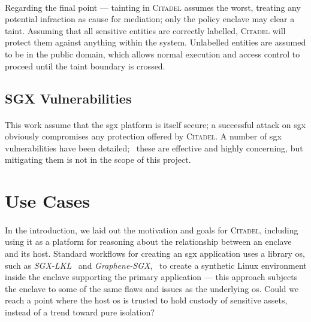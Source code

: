 \paragraph{} Regarding the final point --- tainting in \textsc{Citadel} assumes the worst, treating any potential infraction as cause for mediation; only the policy enclave may clear a taint. Assuming that all sensitive entities are correctly labelled, \textsc{Citadel} will protect them against anything within the system. Unlabelled entities are assumed to be in the public domain, which allows normal execution and access control to proceed until the taint boundary is crossed.

\subsection{SGX Vulnerabilities}
\label{sec:sgx-vulnerabilities}
\paragraph{} This work assume that the \acrshort{sgx} platform is itself secure; a successful attack on \acrshort{sgx} obviously compromises any protection offered by \textsc{Citadel}. A number of \acrshort{sgx} vulnerabilities have been detailed;~\cite{lipp2018meltdown, vanbulck2018foreshadow, Schwarz2019ZombieLoad, ridl, vanbulck2020lvi} these are effective and highly concerning, but mitigating them is not in the scope of this project.

\section{Use Cases}

\paragraph{} In the introduction, we laid out the motivation and goals for \textsc{Citadel}, including using it as a platform for reasoning about the relationship between an enclave and its host. Standard workflows for creating an \acrshort{sgx} application uses a library \acrshort{os}, such as \textit{SGX-LKL}~\cite{priebe2019sgxlkl} and \textit{Graphene-SGX},~\cite{203255} to create a synthetic Linux environment inside the enclave supporting the primary application --- this approach subjects the enclave to some of the same flaws and issues as the underlying \acrshort{os}. Could we reach a point where the host \acrshort{os} is trusted to hold custody of sensitive assets, instead of a trend toward pure isolation?

